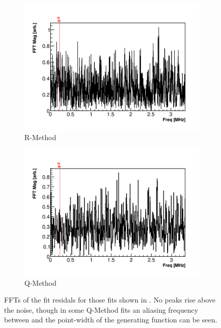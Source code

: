 \begin{figure}
    \begin{subfigure}[t]{0.45\textwidth}
        \centering
        \includegraphics[width=\textwidth]{FFT_RMethod}
        \caption{R-Method}
    \end{subfigure}
    \hspace{1mm}
    \begin{subfigure}[t]{0.45\textwidth}
        \centering
        \includegraphics[width=\textwidth]{FFT_QMethod}
        \caption{Q-Method}
    \end{subfigure}
\caption[]{FFTs of the fit residals for those fits shown in . No peaks rise above the noise, though in some Q-Method fits an aliasing frequency between \gmtwo and the point-width of the generating function can be seen.}
\label{fig:FFTs}
\end{figure}


